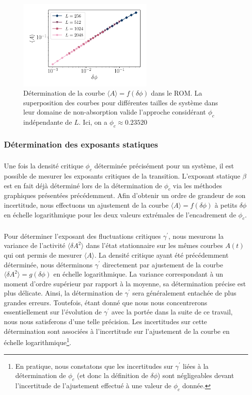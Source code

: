 \begin{figure}[h]
	\centering
	\includegraphics[width=0.6\textwidth]{Chapitre2/Figures/Phi_cindep.pdf}
	\caption{Détermination de la courbe $\langle A \rangle = f(\delta\phi)$ dans le ROM. La superposition des courbes pour différentes tailles de système dans leur domaine de non-absorption valide l'approche considérant $\phi_c$ indépendante de $L$. Ici, on a $\phi_c \approx 0.23520$}
	\label{fig:Effet_Taille_Phic}
\end{figure}

\subsubsection{Détermination des exposants statiques}

\subparagraph{}Une fois la densité critique $\phi_c$ déterminée précisément pour un système, il est possible de mesurer les exposants critiques de la transition. L'exposant statique $\beta$ est en fait déjà déterminé lors de la détermination de $\phi_c$ via les méthodes graphiques présentées précédemment. Afin d'obtenir un ordre de grandeur de son incertitude, nous effectuons un ajustement de la courbe $\langle A \rangle = f(\delta\phi)$ à petits $\delta\phi$ en échelle logarithmique pour les deux valeurs extrémales de l'encadrement de $\phi_c$.

\subparagraph{}Pour déterminer l'exposant des fluctuations critiques $\gamma^\prime$, nous mesurons la variance de l'activité $\langle \delta A^2\rangle$ dans l'état stationnaire sur les mêmes courbes $A(t)$ qui ont permis de mesurer $\langle A \rangle$. La densité critique ayant été précédemment déterminée, nous déterminons $\gamma^\prime$ directement par ajustement de la courbe $\langle \delta A^2\rangle = g(\delta\phi)$ en échelle logarithmique. La variance correspondant à un moment d'ordre supérieur par rapport à la moyenne, sa détermination précise est plus délicate. Ainsi, la détermination de $\gamma^\prime$ sera généralement entachée de plus grandes erreurs. Toutefois, étant donné que nous nous concentrerons essentiellement sur l'évolution de $\gamma^\prime$ avec la portée dans la suite de ce travail, nous nous satisferons d'une telle précision. Les incertitudes sur cette détermination sont associées à l'incertitude sur l'ajustement de la courbe en échelle logarithmique\footnote{En pratique, nous constatons que les incertitudes sur $\gamma^\prime$ liées à la détermination de $\phi_c$ (et donc la définition de $\delta\phi$) sont négligeables devant l'incertitude de l'ajustement effectué à une valeur de $\phi_c$ donnée.}.

